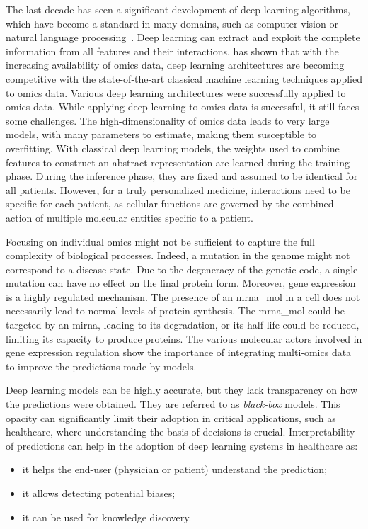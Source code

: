 \documentclass[../main.tex]{subfiles}
\begin{document}
	The last decade has seen a significant development of deep learning algorithms, which have become a standard in many domains, such as computer vision or natural language processing~\cite{lecunDeepLearning2015}.
	Deep learning can extract and exploit the complete information from all features and their interactions.
	\citeauthor{Hanczar2022} has shown that with the increasing availability of omics data, deep learning architectures are becoming competitive with the state-of-the-art classical machine learning techniques applied to omics data.
	Various deep learning architectures were successfully applied to omics data.
	While applying deep learning to omics data is successful, it still faces some challenges.
	The high-dimensionality of omics data leads to very large models, \ie{}with many parameters to estimate, making them susceptible to overfitting.
	With classical deep learning models, the weights used to combine features to construct an abstract representation are learned during the training phase.
	During the inference phase, they are fixed and assumed to be identical for all patients.
	However, for a truly personalized medicine, interactions need to be specific for each patient, as cellular functions are governed by the combined action of multiple molecular entities specific to a patient.

	Focusing on individual omics might not be sufficient to capture the full complexity of biological processes.
	Indeed, a mutation in the genome might not correspond to a disease state.
	Due to the degeneracy of the genetic code, a single mutation can have no effect on the final protein form.
	Moreover, gene expression is a highly regulated mechanism.
	The presence of an \gls{mrna_mol} in a cell does not necessarily lead to normal levels of protein synthesis.
	The \gls{mrna_mol} could be targeted by an \gls{mirna}, leading to its degradation, or its half-life could be reduced, limiting its capacity to produce proteins.
	The various molecular actors involved in gene expression regulation show the importance of integrating multi-omics data to improve the predictions made by models.

	Deep learning models can be highly accurate, but they lack transparency on how the predictions were obtained.
	They are referred to as \emph{black-box} models.
	This opacity can significantly limit their adoption in critical applications, such as healthcare,  where understanding the basis of decisions is crucial.
	Interpretability of predictions can help in the adoption of deep learning systems in healthcare as:
	\begin{itemize}[nosep]
		\item it helps the end-user (physician or patient) understand the prediction;
		\item it allows detecting potential biases;
		\item it can be used for knowledge discovery.
	\end{itemize}
\end{document}
